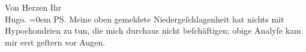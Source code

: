 \pstart
           Von Herzen Ihr{\\[\baselineskip]}\spacefill\mbox{Hugo.}\pend
           \leftskip=0em{}
\pstart
           \noindent{}\textsc{PS}. Meine oben gemeldete Niedergeſchlagenheit hat nichts
                  mit Hypochondrien zu tun, die mich durchaus nicht beſchäftigen; obige Analyſe kam
                  mir erst geſtern vor Augen.\pend
           \endnumbering{}  
      